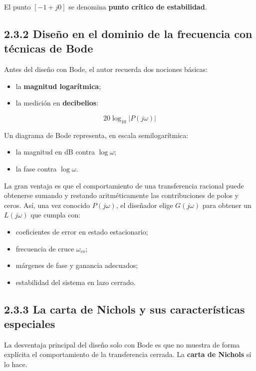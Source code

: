 El punto \([-1+j0]\) se denomina \textbf{punto crítico de estabilidad}.

\subsection{2.3.2 Diseño en el dominio de la frecuencia con técnicas de Bode}
Antes del diseño con Bode, el autor recuerda dos nociones básicas:

\begin{itemize}
  \item la \textbf{magnitud logarítmica};
  \item la medición en \textbf{decibelios}:
\end{itemize}

$$
20\log_{10}|P(j\omega)|
$$

Un diagrama de Bode representa, en escala semilogarítmica:

\begin{itemize}
  \item la magnitud en dB contra \(\log \omega\);
  \item la fase contra \(\log \omega\).
\end{itemize}

La gran ventaja es que el comportamiento de una transferencia racional puede obtenerse sumando y restando aritméticamente las contribuciones de polos y ceros. Así, una vez conocido \(P(j\omega)\), el diseñador elige \(G(j\omega)\) para obtener un \(L(j\omega)\) que cumpla con:

\begin{itemize}
  \item coeficientes de error en estado estacionario;
  \item frecuencia de cruce \(\omega_{co}\);
  \item márgenes de fase y ganancia adecuados;
  \item estabilidad del sistema en lazo cerrado.
\end{itemize}


\subsection{2.3.3 La carta de Nichols y sus características especiales}
La desventaja principal del diseño solo con Bode es que no muestra de forma explícita el comportamiento de la transferencia cerrada. La \textbf{carta de Nichols} sí lo hace.

